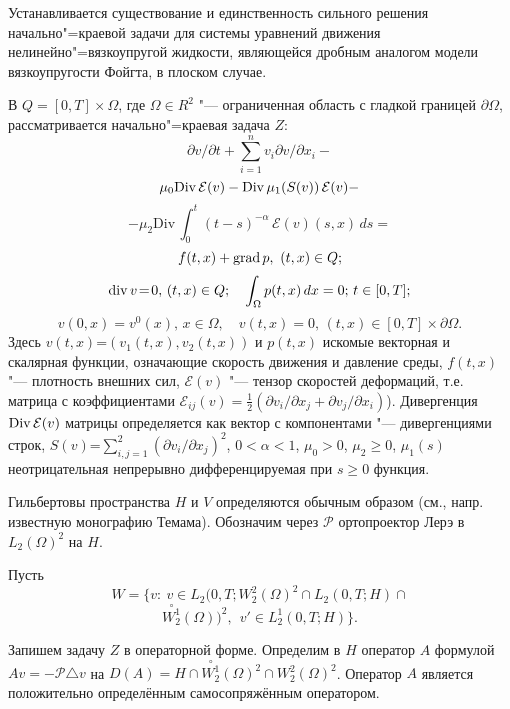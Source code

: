 \vzmscaption

Устанавливается существование и единственность сильного решения начально"=краевой задачи для системы уравнений движения нелинейно"=вязкоупругой жидкости, являющейся дробным аналогом модели вязкоупругости Фойгта, в плоском случае.

В $Q=[0,T] \times \Omega$, где $ \Omega\in R^2$ "--- ограниченная область с гладкой границей $\partial \Omega$, рассматривается начально"=краевая задача $Z$:
$$
\partial v/\partial t + {\sum_{i=1}^n } v_i \partial v /\partial x_i -
$$
$$
 \mu_0 {\rm Div}\,\mathcal{E}(v) -{\rm Div}\,\mu_1(S(v))\,\mathcal{E}(v)-
$$
$$
-\mu_2\mathrm{Div}\,\int_{0}^t(t-s)^{-\alpha}\,\mathcal{E}(v)(s, x)\,ds =
$$
$$
f(t,x)+{\rm grad} \, p,\ (t,x) \in Q;
$$
$$
{\rm div}\,v \!=\!0,\, (t,x) \in Q; \quad \int_{\Omega} p(t,x)\, dx=0;\, t\in [0,T];
$$
$$
 v(0,x) = v^0 (x), \, x\in \Omega,\quad v(t,x)=0,\, (t,x)\in [0,T]\times \partial\Omega.
$$
Здесь $v(t,x)$=$ (v_1(t,x),v_2(t,x))$ и $p(t,x)$ искомые векто\-рная и скалярная
функции, означающие скорость движе\-ния и давление среды, $f(t,x)$ "---
плотность внешних сил, $\mathcal{E}(v)$ "--- тензор
скоростей деформаций, т.е. матрица с коэффициентами $\mathcal{E}_{ij}(v)\! =\! \frac 1
2 (\partial v_i/\partial x_j +\partial v_j/\partial x_i )$).
Дивергенция ${\rm Div}\, \mathcal{E}(v)$ матрицы определяется как вектор с
компонентами "--- дивергенциями строк, $S(v)$=$\sum_{i,j=1}^{2} (
\partial v_i/\partial x_j)^2$, $0<\alpha<1$, $\mu_0>0$, $\mu_2\ge 0$, $\mu_1(s)$ неотрицательная непрерывно
дифференцируемая при $s\ge 0$ функция.


 Гильбертовы пространства $H$ и $V$ определяются обычным образом
 (см., напр. известную монографию Темама).
Обозначим через $\mathcal{P}$ ортопроектор Лерэ в $L_2(\Omega)^2$ на $H$.

Пусть
$$
W\!=\{v:\ v\in L_2(0,T;W_2^2(\Omega)^2\cap L_2(0,T; H) \cap $$$$\stackrel{\circ}{W_2^1}(\Omega))^2,\ \ v'\in L_2^1(0,T;H)\}.
$$

Запишем задачу $Z$ в операторной форме.
 Определим в $H$ оператор $A$ формулой $Av=-{\mathcal{P}}\triangle v$ на $D(A)=H \cap \stackrel{\circ}{W_2^1}(\Omega)^2\cap {W_2^2}(\Omega)^2$. Оператор $A$ является положительно определённым самосопряжённым оператором.

